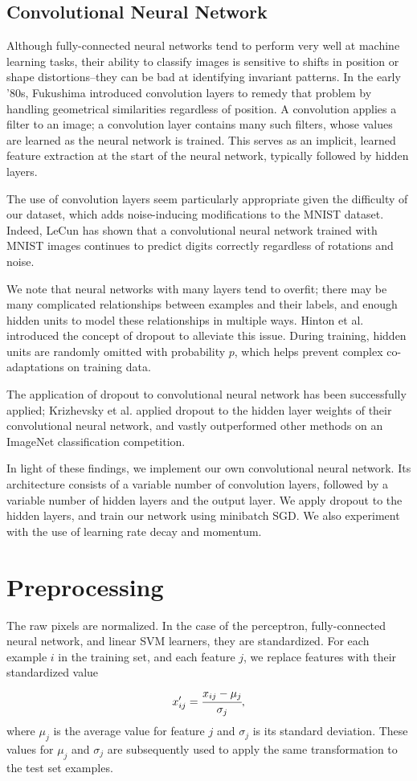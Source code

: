 \documentclass{acm_proc_article-sp}
\begin{document}
\subsection{Convolutional Neural Network}
Although fully-connected neural networks tend to perform very well at machine learning tasks, their ability to classify images is sensitive to shifts in position or shape distortions--they can be bad at identifying invariant patterns. In the early '80s, Fukushima introduced convolution layers to remedy that problem by handling geometrical similarities regardless of position.\cite{Fukushima} A convolution applies a filter to an image; a convolution layer contains many such filters, whose values are learned as the neural network is trained. This serves as an implicit, learned feature extraction at the start of the neural network, typically followed by hidden layers.

The use of convolution layers seem particularly appropriate given the difficulty of our dataset, which adds noise-inducing modifications to the MNIST dataset. Indeed, LeCun has shown that a convolutional neural network trained with MNIST images continues to predict digits correctly regardless of rotations and noise.\cite{LeCun}

We note that neural networks with many layers tend to overfit; there may be many complicated relationships between examples and their labels, and enough hidden units to model these relationships in multiple ways. Hinton et al.\cite{Hinton} introduced the concept of dropout to alleviate this issue. During training, hidden units are randomly omitted with probability $p$, which helps prevent complex co-adaptations on training data. 

The application of dropout to convolutional neural network has been successfully applied; Krizhevsky et al. applied dropout to the hidden layer weights of their convolutional neural network, and vastly outperformed other methods on an ImageNet classification competition.\cite{Krizhevsky} 

In light of these findings, we implement our own convolutional neural network. Its architecture consists of a variable number of convolution layers, followed by a variable number of hidden layers and the output layer. We apply dropout to the hidden layers, and train our network using minibatch SGD. We also experiment with the use of learning rate decay and momentum.

\section{Preprocessing}
The raw pixels are normalized. In the case of the perceptron, fully-connected neural network, and linear SVM learners, they are standardized. For each example $i$ in the training set, and each feature $j$, we replace features with their standardized value $$x'_{ij} = \cfrac{x_{ij} - \mu_{j}}{\sigma_{j}},$$ where $\mu_j$ is the average value for feature $j$ and $\sigma_j$ is its standard deviation. These values for $\mu_j$ and $\sigma_j$ are subsequently used to apply the same transformation to the test set examples.
\end{document}
